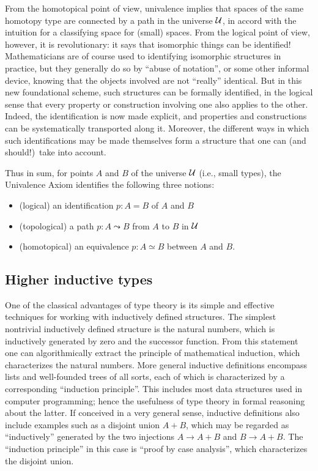 From the homotopical point of view, univalence implies that spaces of the same homotopy type are connected by a path in the universe $\mathcal{U}$, in accord with the intuition for a classifying space for (small) spaces.
From the logical point of view, however, it is revolutionary: it says that isomorphic things can be identified!  Mathematicians are of course used to identifying isomorphic structures in practice, but they generally do so by ``abuse of notation'', or some other informal device, knowing that the objects involved are not ``really'' identical.  But in this new foundational scheme, such structures can be formally identified, in the logical sense that every property or construction involving one also applies to the other. Indeed, the identification is now made explicit, and properties and constructions can be systematically transported along it.  Moreover, the different ways in which such identifications may be made themselves form a structure that one can (and should!)\ take into account.

Thus in sum, for points $A$ and $B$ of the universe $\mathcal{U}$ (i.e., small types), the Univalence Axiom identifies the following three notions:
\begin{itemize}
\item (logical) an identification $p:A=B$ of $A$ and $B$
\item (topological) a path $p:A \leadsto B$ from $A$ to $B$ in $\mathcal{U}$
\item (homotopical) an equivalence $p:A\simeq B$ between $A$ and $B$.
\end{itemize}


\subsection*{Higher inductive types}

One of the classical advantages of type theory is its simple and effective techniques for working with inductively defined structures.
The simplest nontrivial inductively defined structure is the natural numbers, which is inductively generated by zero and the successor function.
From this statement one can algorithmically extract the principle of mathematical induction, which characterizes the natural numbers.
More general inductive definitions encompass lists and well-founded trees of all sorts, each of which is characterized by a corresponding ``induction principle''.
This includes most data structures used in computer programming; hence the usefulness of type theory in formal reasoning about the latter.
If conceived in a very general sense, inductive definitions also include examples such as a disjoint union $A+B$, which may be regarded as ``inductively'' generated by the two injections $A\to A+B$ and $B\to A+B$.
The ``induction principle'' in this case is ``proof by case analysis'', which characterizes the disjoint union.

